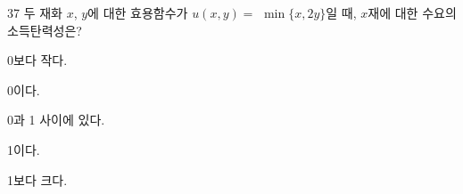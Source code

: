 \begin{question}{37}
두 재화 $x$, $y$에 대한 효용함수가 $u(x,y)=$ $\min\{x,2y\}$일 때, $x$재에 대한 수요의 소득탄력성은?
\begin{choices}
  \item 0보다 작다.
  \item 0이다.
  \item 0과 1 사이에 있다.
  \item 1이다.
  \item 1보다 크다.
\end{choices}
\end{question}
